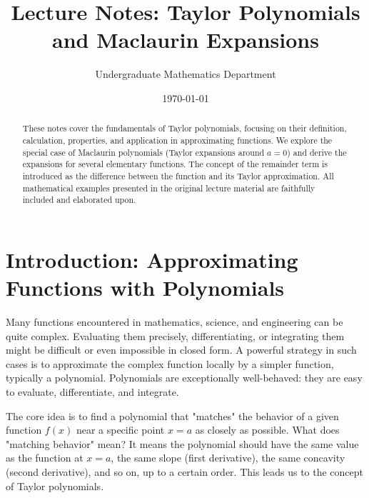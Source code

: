 \documentclass[11pt]{article}
\title{Lecture Notes: Taylor Polynomials and Maclaurin Expansions}
\author{Undergraduate Mathematics Department} %
\date{\today} %
\theoremstyle{definition}
\theoremstyle{remark}
\begin{document}
\maketitle

\begin{abstract}
    These notes cover the fundamentals of Taylor polynomials, focusing on their definition, calculation, properties, and application in approximating functions. We explore the special case of Maclaurin polynomials (Taylor expansions around $a=0$) and derive the expansions for several elementary functions. The concept of the remainder term is introduced as the difference between the function and its Taylor approximation. All mathematical examples presented in the original lecture material are faithfully included and elaborated upon.
\end{abstract}

\tableofcontents


\section{Introduction: Approximating Functions with Polynomials}

Many functions encountered in mathematics, science, and engineering can be quite complex. Evaluating them precisely, differentiating, or integrating them might be difficult or even impossible in closed form. A powerful strategy in such cases is to approximate the complex function locally by a simpler function, typically a polynomial. Polynomials are exceptionally well-behaved: they are easy to evaluate, differentiate, and integrate.

The core idea is to find a polynomial that "matches" the behavior of a given function $f(x)$ near a specific point $x=a$ as closely as possible. What does "matching behavior" mean? It means the polynomial should have the same value as the function at $x=a$, the same slope (first derivative), the same concavity (second derivative), and so on, up to a certain order. This leads us to the concept of Taylor polynomials.
\end{document}
